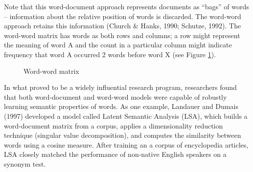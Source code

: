 \documentclass[man,floatsintext]{apa6}
\begin{document}
Note that this word-document approach represents documents as ``bags''
of words -- information about the relative position of words is
discarded. The word-word approach retains this information (Church \&
Hanks, 1990; Schutze, 1992). The word-word matrix has words as both
rows and columns; a row might represent the meaning of word A and the
count in a particular column might indicate frequency that word A
occurred 2 words before word X (see Figure \ref{matrix-word-word}).

\begin{figure}
  \begin{center} \footnotesize{}
    \caption{Word-word matrix}
    \label{matrix-word-word}
  \end{center}
\end{figure}

In what proved to be a widely influential research program,
researchers found that both word-document and word-word models were
capable of robustly learning semantic properties of words. As one
example, Landauer and Dumais (1997) developed a model called Latent
Semantic Analysis (LSA), which builds a word-document matrix from a
corpus, applies a dimensionality reduction technique (singular value
decomposition), and computes the similarity between words using a
cosine measure. After training an a corpus of encyclopedia articles,
LSA closely matched the performance of non-native English speakers on
a synonym test.
\end{document}
